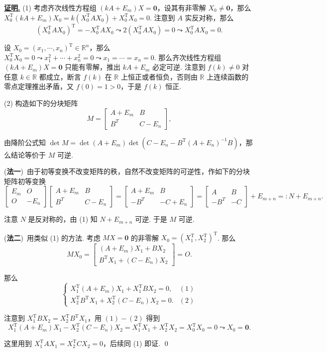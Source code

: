 \documentclass[10pt,openany]{article}
\theoremstyle{thmstyle} %
\theoremstyle{defstyle} %
\theoremstyle{prostyle} %
\theoremstyle{exastyle}
\theoremstyle{remstyle}
\renewenvironment{proof}[1][证明]{\par\underline{\textbf{#1.}} \;\fangsong}{\qed\par}
\newcommand{\T}{^{\text{T}}}
\newcommand{\R}{\mathbb{R}}
\begin{document}
\begin{proof}
	(1) 考虑齐次线性方程组 \( (kA+E_m)X=\bm{0} \)，设其有非零解 \( X_0 \neq \bm{0} \)，那么 \( X_0\T (kA+E_m) X_0= k (X_0\T A X_0)+ X_0\T X_0=0 \). 注意到 \( A \) 实反对称，那么 
	\[ (X_0\T A X_0)\T= -X_0\T A X_0 \leadsto 2(X_0\T A X_0)=0 \leadsto X_0\T A X_0=0.\]
	
	设 \( X_0=(x_1,\cdots,x_n)\T \in \R^n \)，那么 \( X_0\T X_0=0 \leadsto x_1^2+\cdots+x_n^2=0 \leadsto x_1=\cdots=x_n=0 \). 那么齐次线性方程组 \( (kA+E_m)X=\bm{0} \) 只能有零解，推出 \( kA+E_m \) 必定可逆. 注意到 \( f(k) \neq 0 \) 对任意 \( k \in \R \) 都成立，断言 \( f(k) \) 在 \( \R \) 上恒正或者恒负，否则由 \( \R \) 上连续函数的零点定理推出矛盾，又 \( f(0)=1>0 \)，于是 \( f(k) \) 恒正.
	
	(2) 构造如下的分块矩阵
	\[ M=\begin{bmatrix}
		A+E_m & B \\
		B^T & C-E_n
	\end{bmatrix}, \]
	
	由降阶公式知 \( \det M= \det (A+E_m) \det (C-E_n-B\T(A+E_n)^{-1}B) \)，那么结论等价于 \( M \) 可逆.
	
	(\textbf{法一})\ 由于初等变换不改变矩阵的秩，自然不改变矩阵的可逆性，作如下的分块矩阵初等变换
	\[ \begin{bmatrix}
		E_m & O \\
		O & -E_n
	\end{bmatrix}\begin{bmatrix}
	A+E_m & B \\
	B^T & C-E_n
	\end{bmatrix}=\begin{bmatrix}
	A+E_m & B \\
	-B^T & -C+E_n
	\end{bmatrix}=\begin{bmatrix}
	A & B \\
	-B^T & -C
	\end{bmatrix}+E_{m+n}=:N+E_{m+n}. \]
	
	注意 \( N \) 是反对称的，由 (1) 知 \( N+E_{m+n} \) 可逆. 于是 \( M \) 可逆.
	
	\vspace{1ex}
	
	(\textbf{法二})\ 用类似 (1) 的方法. 考虑 \( MX=\bm{0} \) 的非零解 \( X_0=(X_1\T,X_2\T)\T \). 那么
	\[ MX_0= \begin{bmatrix}
		(A+E_m)X_1+BX_2 \\
		B\T X_1+(C-E_n)X_2
	\end{bmatrix}=O. \]
	
	那么
	\[ \left\{ \begin{array}{lc}
		X_1\T (A+E_m)X_1+ X_1\T BX_2=0, & (1) \\
		X_2\T B\T X_1+ X_2\T (C-E_n)X_2=0.  & (2)
	\end{array}\right. \]
	
	注意到 \( X_1\T BX_2=X_2\T B\T X_1 \)，用 \( (1)-(2) \) 得到
	\[ X_1\T (A+E_m)X_1-X_2\T (C-E_n)X_2=X_1\T X_1+X_2\T X_2=X_0\T X_0=0 \leadsto X_0=\bm{0}. \]
	
	这里用到 \( X_1\T AX_1=X_2\T CX_2=0 \)，后续同 (1) 即证.
\end{proof}
\end{document}
